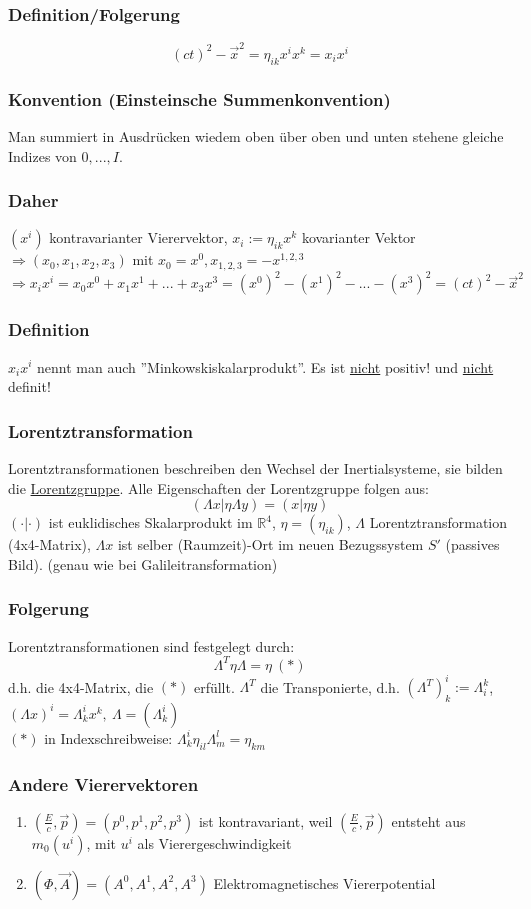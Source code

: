 \documentclass[twoside,a4paper]{scrartcl}
\newcommand{\R}{\mathbb{R}}
\renewcommand{\1}{\mathds{1}}
\newcommand{\Ra}{\Rightarrow}
\renewcommand{\L}{\Lambda}
\renewcommand{\R}{\mathbb{R}}
\begin{document}
\subsubsection*{Definition/Folgerung}
$$(ct)^2-\vec x^2= \eta_{ik} x^ix^k=x_ix^i$$
\subsubsection*{Konvention (Einsteinsche Summenkonvention)}
Man summiert in Ausdrücken wiedem oben über oben und unten stehene gleiche Indizes von $0,...,I$.
\subsubsection*{Daher}
$(x^i)$ kontravarianter Vierervektor, $x_i:= \eta_{ik}x^k$ kovarianter Vektor\\
$\Ra (x_0,x_1,x_2,x_3)$ mit $x_0=x^0, x_{1,2,3}=-x^{1,2,3}$\\
$\Ra x_ix^i=x_0x^0+x_1x^1+...+x_3x^3=(x^0)^2-(x^1)^2-...-(x^3)^2=(ct)^2-\vec x^2$
\subsubsection*{Definition}
 $x_ix^i$ nennt man auch ''Minkowskiskalarprodukt''. Es ist \underline{nicht} positiv! und \underline{nicht} definit!
\subsubsection*{Lorentztransformation}
Lorentztransformationen beschreiben den Wechsel der Inertialsysteme, sie bilden die \underline{Lorentzgruppe}. Alle Eigenschaften der Lorentzgruppe folgen aus:
$$(\L x|\eta\L y)=(x|\eta y)$$
$(\cdot|\cdot)$ ist euklidisches Skalarprodukt im $\R^4$, $\eta=(\eta_{ik})$, $\L$ Lorentztransformation (4x4-Matrix), $\L x$ ist selber (Raumzeit)-Ort im neuen Bezugssystem $S'$ (passives Bild). (genau wie bei Galileitransformation)
\subsubsection*{Folgerung}
Lorentztransformationen sind festgelegt durch:
$$\L ^T \eta \L = \eta \ (*)$$
d.h. die 4x4-Matrix, die $(*)$ erfüllt. $\L^T$ die Transponierte, d.h. $(\L^T)_k^i:=\L_i^k$, $(\L x)^i=\L_k^i x^k, \ \L=(\L_k^i)$\\
$(*)$ in Indexschreibweise: $\L_k^i \eta_{il} \L_m^l=\eta_{km}$
\subsubsection*{Andere Vierervektoren}
\begin{enumerate}
\item $(\frac{E}{c},\vec p)=(p^0,p^1,p^2,p^3)$ ist kontravariant, weil $(\frac{E}{c},\vec p)$ entsteht aus $m_0(u^i)$, mit $u^i$ als Vierergeschwindigkeit
\item $(\Phi,\vec A)=(A^0,A^1,A^2,A^3)$ Elektromagnetisches Viererpotential
\end{enumerate}
\end{document}
